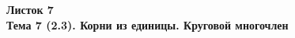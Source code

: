 \documentclass[a4paper, 11pt]{article}
\begin{document}
\begin{center} \Large \bf Листок 7\\ Тема 7 (2.3). Корни из единицы. Круговой многочлен \end{center}


\end{document}
